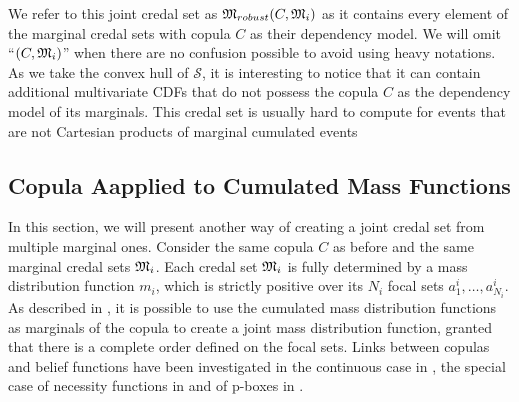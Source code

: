 We refer to this joint credal set as ${\mathfrak{M}}_{robust}(C,{\mathfrak{M}}_i)$ as it contains every element of the marginal credal sets with copula $C$ as their dependency model. We will omit ``$(C,{\mathfrak{M}}_i)$'' when there are no confusion possible to avoid using heavy notations. As we take the convex hull of $\mathcal{S}$, it is interesting to notice that it can contain additional multivariate CDFs that do not possess the copula $C$ as the dependency model of its marginals. This credal set is usually hard to compute for events that are not Cartesian products of marginal cumulated events

\subsection{Copula Aapplied to Cumulated Mass Functions}\label{sec:joint_mass}
In this section, we will present another way of creating a joint credal set from multiple marginal ones. Consider the same copula $C$ as before and the same marginal credal sets ${\mathfrak{M}}_i$. Each credal set ${\mathfrak{M}}_i$ is fully determined by a mass distribution function $m_i$, which is strictly positive over its $N_i$ focal sets $a^i_1, \dots, a^i_{N_i}$. As described in \cite{ferson_dependence_2004}, it is possible to use the cumulated mass distribution functions as marginals of the copula to create a joint mass distribution function, granted that there is a complete order defined on the focal sets. Links between copulas and belief functions have been investigated in the continuous case in \cite{schmelzer_joint_2015, schmelzer_multivariate_2019}, the special case of necessity functions in \cite{schmelzer_sklars_2015} and of p-boxes in \cite{schmelzer_random_2023}.

